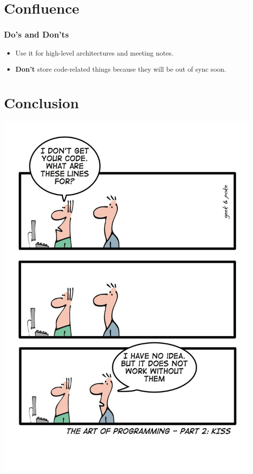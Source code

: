 \documentclass{efd-lecture}
\begin{document}
\section{Confluence}

\begin{frame}
  \frametitle{Do's and Don'ts}
  \begin{itemize}
    \item Use it for high-level architectures and meeting notes.
    \item \textbf{\color{RubineRed}Don't} store code-related things because they will be out of sync soon.
  \end{itemize}
\end{frame}

\section{Conclusion}

\begin{frame}
  \begin{center}
  \includegraphics[height=\textheight]{./img/cartoon-1.png}
  \end{center}
\end{frame}
\end{document}
